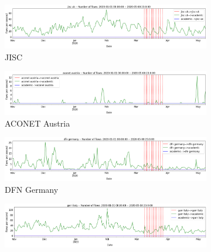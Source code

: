 \documentclass[10pt, journal, letterpaper]{IEEEtran}
\newcommand\linearFigSze{0.48}
\begin{document}
\begin{figure}
    \begin{subfigure}{\linearFigSze\textwidth}
          \centering
          \includegraphics[width=\columnwidth]{img/jisc_aca_fps.png}
          \caption{JISC}
          \label{fig:jisc_aca_fps}
    \end{subfigure}
    \begin{subfigure}{\linearFigSze\textwidth}
          \centering
          \includegraphics[width=\columnwidth]{img/aconet_aca_fps.png}
          \caption{ACONET Austria}
          \label{fig:aconet_aca_fps}
    \end{subfigure}
    \begin{subfigure}{\linearFigSze\textwidth}
          \centering
          \includegraphics[width=\columnwidth]{img/dfn_aca_fps.png}
          \caption{DFN Germany}
          \label{fig:dfn_aca_fps}
    \end{subfigure}
    \begin{subfigure}{\linearFigSze\textwidth}
          \centering
          \includegraphics[width=\columnwidth]{img/garr_aca_fps.png}

\end{subfigure}
\end{figure}
\end{document}
